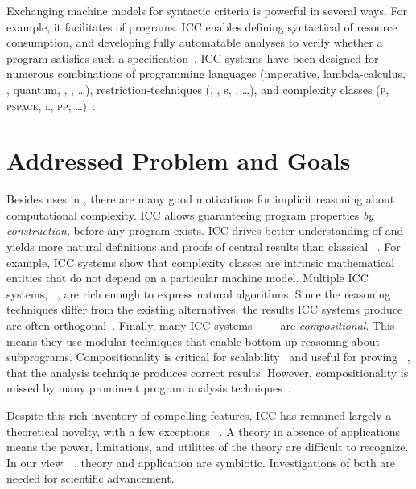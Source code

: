 Exchanging machine models for syntactic criteria is powerful in several ways.
For example, it facilitates  of programs. ICC enables
defining {syntactical}  of resource consumption, and
developing fully automatable analyses to verify whether a program satisfies such
a specification~\cite{heraud2011}. ICC systems have been designed for numerous
combinations of programming languages (imperative,
lambda-calculus, ,
quantum, ,
, \ldots), restriction-techniques (,
, s, , \ldots),
and complexity classes (\textsc{p}, \textsc{pspace}, \textsc{l}, \textsc{pp},
\ldots)~\cite{moyen2017,pchoux2020}.

\section{Addressed Problem and Goals}
\label{sec:aicc-goals}

Besides uses in , there are many
good motivations for implicit reasoning about computational complexity. ICC
allows guaranteeing program properties \emph{by construction}, before any
program exists. ICC drives better understanding of  and yields more natural definitions and proofs
of central results than classical ~\cite{kristiansen2017}. For example, ICC systems
show that complexity classes are intrinsic mathematical entities that do not
depend on a particular machine model. Multiple ICC systems,
\eg~\cite{jones2009,marion2011}, are rich enough to express natural algorithms.
Since the reasoning techniques differ from the existing alternatives, the
results ICC systems produce are often orthogonal~\cite{aubert20222}. Finally,
many ICC systems---\eg~\cite{jones2009,marion2011,hainry2023,atkey2024}---are
\emph{compositional}. This means they use modular
techniques that enable bottom-up reasoning about subprograms. Compositionality
is critical for scalability~\cite{carbonneaux2015} and useful for proving
~\cite{keidel2021}, \ie that the analysis technique
produces correct results. However, compositionality is missed by many prominent
program analysis techniques~\cite{carbonneaux2015,schiebel2024}.

Despite this rich inventory of compelling features, ICC has remained largely a
theoretical novelty, with a few exceptions%
~\cite{avanzini2017,avanzini2008,moyen20172,hainry2021,hoffmann2012,feree2018}.
A theory in absence of applications means the power, limitations, and utilities
of the theory are difficult to recognize. In our view~\cite[p.
xxxv]{bishop2003}~\cite[p. 75]{moyen2017}, theory and application are
{symbiotic}. Investigations of both are needed for scientific advancement.

